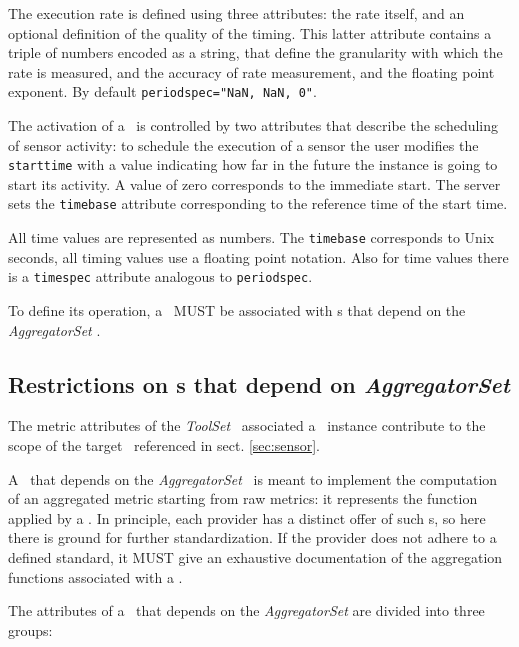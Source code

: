 \documentclass[12pt]{article}  %
\begin{document}
The execution rate is defined using three attributes: the rate itself, and an optional definition of the quality of the timing. This latter attribute contains a triple of numbers encoded as a string, that define the granularity with which the rate is measured, and the accuracy of rate measurement, and the floating point exponent. By default \verb|periodspec="NaN, NaN, 0"|.

The activation of a \sens\ is controlled by two attributes that describe the scheduling of sensor activity: to schedule the execution of a sensor the user modifies the {\tt starttime} with a value indicating how far in the future the instance is going to start its activity. A value of zero corresponds to the immediate start. The server sets the {\tt timebase} attribute corresponding to the reference time of the start time.

All time values are represented as numbers. The {\tt timebase} corresponds to Unix seconds, all timing values use a floating point notation. Also for time values there is a {\tt timespec} attribute analogous to {\tt periodspec}.

To define its operation, a \sens\ MUST be associated with \mi s that depend on the {\em AggregatorSet} \mi .

\subsection{Restrictions on \mi s that depend on {\em AggregatorSet} \label{sec:Aggregator}}

The metric attributes of the {\em ToolSet} \mi\ associated a \coll\ instance contribute to the scope of the target \sens\ referenced in sect. \ref{sec:sensor}.

A \mi\ that depends on the {\em AggregatorSet} \mi\ is meant to implement the computation of an aggregated metric starting from raw metrics: it represents the function applied by a \sens. In principle, each provider has a distinct offer of such \mi s, so here there is ground for further standardization. If the provider does not adhere to a defined standard, it MUST give an exhaustive documentation of the aggregation functions associated with a \mi.

The attributes of a \mi\ that depends on the {\em AggregatorSet} are divided into three groups:
\end{document}
